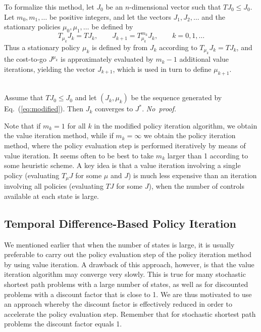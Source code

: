To formalize this method, let $J_0$ be an $n$-dimensional vector such that $TJ_0 \leq J_0$. Let $m_0,m_1,\ldots$ be positive integers, and let the vectors $J_1, J_2, \ldots$ and the stationary policies $\mu_0,\mu_1,\ldots$ be defined by 
\begin{equation} \label{eq:modified}
T_{\mu_k}J_k = TJ_k, \qquad J_{k+1}=T^{m_k}_{\mu_k}J_k, \qquad k=0,1,\ldots
\end{equation}
Thus a stationary policy $\mu_k$ is defined by from $J_k$ according to $T_{\mu_k}J_k = TJ_k$, and the cost-to-go $J^{\mu_k}$ is approximately evaluated by $m_k-1$ additional value iterations, yielding the vector $J_{k+1}$, which is used in turn to define $\mu_{k+1}$.
\begin{theorem} \hfill \\
Assume that $TJ_0 \leq J_0$ and let $(J_k,\mu_k)$ be the sequence generated by Eq.~(\ref{eq:modified}). Then $J_k$ converges to $J^*$. \hfill {\it No~proof.}
\end{theorem}


Note that if $m_k=1$ for all $k$ in the modified policy iteration algorithm, we obtain the value iteration method, while if $m_k = \infty$ we obtain the policy iteration method, where the policy evaluation step is performed iteratively by means of value iteration. It seems often to be best to take $m_k$ larger than 1 according to some heuristic scheme. A key idea is that a value iteration involving a single policy (evaluating $T_\mu J$ for some $\mu$ and $J$) is much less expensive than an iteration involving all policies (evaluating $TJ$ for some $J$), when the number of controls available at each state is large.





\subsection{Temporal Difference-Based Policy Iteration}
\label{sec:dp:temporaldifference}
We mentioned earlier that when the number of states is large, it is usually preferable to carry out the policy evaluation step of the policy iteration method by using value iteration. A drawback of this approach, however, is that the value iteration algorithm may converge very slowly. This is true for many stochastic shortest path problems with a large number of states, as well as for discounted problems with a discount factor that is close to 1. We are thus motivated to use an approach whereby the discount factor is effectively reduced in order to accelerate the policy evaluation step. Remember that for stochastic shortest path problems the discount factor equals 1.

